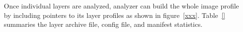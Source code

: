Once individual layers are analyzed, analyzer can build the whole image profile by including pointers to its layer profiles as shown in figure~\ref{xxx}.
%
Table~\ref{} summaries the layer archive file, config file, and manifest statistics.




